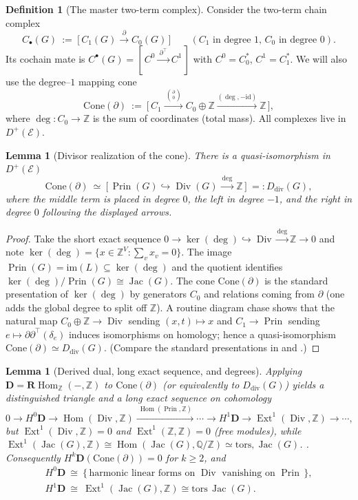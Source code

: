 \documentclass[12pt]{article}
\DeclareMathOperator{\Div}{Div}
\DeclareMathOperator{\Prin}{Prin}
\DeclareMathOperator{\Jac}{Jac}
\newcommand{\E}{\mathcal{E}}
\newcommand{\ZZ}{\mathbb{Z}}
\newcommand{\QQ}{\mathbb{Q}}
\newcommand{\Hom}{\operatorname{Hom}}
\newcommand{\Ext}{\operatorname{Ext}}
\newcommand{\RHom}{\mathbf{R}\!\operatorname{Hom}}
\newcommand{\Dplus}{D^{+}}
\theoremstyle{plain}
\newtheorem{lemma}[theorem]{Lemma}
\theoremstyle{definition}
\newtheorem{definition}[theorem]{Definition}
\theoremstyle{remark}
\numberwithin{equation}{section}
\begin{document}
\begin{definition}[The master two-term complex]
Consider the two-term chain complex
\[
C_\bullet(G)\ :=\ \bigl[\, C_1(G)\xrightarrow{\ \partial\ } C_0(G)\,\bigr]\qquad(\text{$C_1$ in degree $1$, $C_0$ in degree $0$}).
\]
Its cochain mate is $C^\bullet(G)=[\,C^0\xrightarrow{\ \partial^\top\ }C^1\,]$ with $C^0=C_0^\ast$, $C^1=C_1^\ast$. We will also use the degree--$1$ mapping cone
\[
\mathrm{Cone}(\partial)\ :=\ \bigl[\, C_1 \xrightarrow{\ \binom{\partial}{0}\ } C_0\oplus \ZZ \xrightarrow{(\deg,-\mathrm{id})} \ZZ \,\bigr],
\]
where $\deg:C_0\to\ZZ$ is the sum of coordinates (total mass). All complexes live in $\Dplus(\E)$.
\end{definition}

\begin{lemma}[Divisor realization of the cone]\label{lem:cone-div}
There is a quasi-isomorphism in $\Dplus(\E)$
\[
\mathrm{Cone}(\partial)\ \simeq\ \bigl[\, \Prin(G)\hookrightarrow \Div(G)\xrightarrow{\ \deg\ }\ZZ \,\bigr]\ =: D_{\mathrm{div}}(G),
\]
where the middle term is placed in degree $0$, the left in degree $-1$, and the right in degree $0$ following the displayed arrows.
\end{lemma}

\begin{proof}
Take the short exact sequence $0\to \ker(\deg)\hookrightarrow \Div\xrightarrow{\deg}\ZZ\to 0$ and note $\ker(\deg)=\{x\in\ZZ^{V}:\sum_{v}x_v=0\}$. The image $\Prin(G)=\mathrm{im}(L)\subseteq\ker(\deg)$ and the quotient identifies $\ker(\deg)/\Prin(G)\cong \Jac(G)$. The cone $\mathrm{Cone}(\partial)$ is the standard presentation of $\ker(\deg)$ by generators $C_0$ and relations coming from $\partial$ (one adds the global degree to split off $\ZZ$). A routine diagram chase shows that the natural map $C_0\oplus \ZZ\to \Div$ sending $(x,t)\mapsto x$ and $C_1\to \Prin$ sending $e\mapsto \partial\partial^\top(\delta_e)$ induces isomorphisms on homology; hence a quasi-isomorphism $\mathrm{Cone}(\partial)\simeq D_{\mathrm{div}}(G)$. (Compare the standard presentations in \cite{Biggs1993} and \cite{BakerNorine2007}.)
\end{proof}

\begin{lemma}[Derived dual, long exact sequence, and degrees]\label{lem:les2}
Applying $\mathbf D=\RHom_{\ZZ}(-,\ZZ)$ to $\mathrm{Cone}(\partial)$ (or equivalently to $D_{\mathrm{div}}(G)$) yields a distinguished triangle and a long exact sequence on cohomology
\[
0\to H^0\mathbf D \longrightarrow \Hom(\Div,\ZZ)\xrightarrow{\ \Hom(\Prin,\ZZ)\ } \cdots \longrightarrow H^1\mathbf D \longrightarrow \Ext^1(\Div,\ZZ)\to\cdots,
\]
but $\Ext^1(\Div,\ZZ)=0$ and $\Ext^1(\ZZ,\ZZ)=0$ (free modules), while $\Ext^1(\Jac(G),\ZZ)\cong\Hom(\Jac(G),\QQ/\ZZ)\simeq\mathrm{tors},\Jac(G)$. \cite{Weibel1994}. Consequently $H^k\mathbf D(\mathrm{Cone}(\partial))=0$ for $k\ge 2$, and
\begin{gather*}
H^0\mathbf D\ \cong\ \{\,\text{harmonic linear forms on }\Div\text{ vanishing on }\Prin\,\},\\
H^1\mathbf D\ \cong\ \Ext^1(\Jac(G),\ZZ)\cong \mathrm{tors}\,\Jac(G).
\end{gather*}
\end{lemma}
\end{document}
